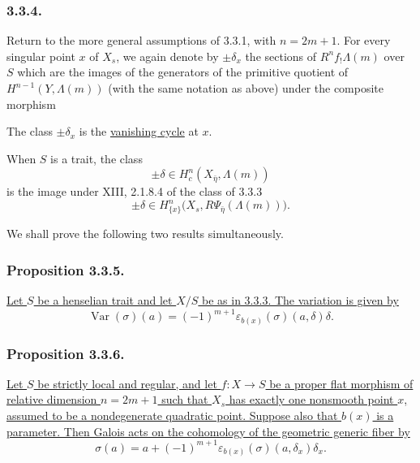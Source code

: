 \subsubsection*{3.3.4.}
Return to the more general assumptions of 3.3.1, with $n=2m+1$.
For every singular point $x$ of $X_s$, we again denote by
$\pm\delta_x$ the sections of $R^nf_!\Lambda(m)$ over $S$ which are
the images of the generators of the primitive quotient of
$H^{n-1}(Y,\Lambda(m))$ (with the same notation as above) under the
composite morphism
\begin{center}
\end{center}
The class $\pm\delta_x$ is the \underline{vanishing cycle} at $x$.

When $S$ is a trait, the class
\[
\pm\delta\in H_c^n(X_{\bar\eta},\Lambda(m))
\]
is the image under XIII, 2.1.8.4 of the class of 3.3.3
\[
\pm\delta\in
H^n_{\{x\}}\bigl(X_s,R\Psi_{\bar\eta}(\Lambda(m))\bigr).
\]

We shall prove the following two results simultaneously.

\subsubsection*{Proposition 3.3.5.}
\underline{Let $S$ be a henselian trait and let $X/S$ be as in
3.3.3.  The variation is given by}
\[
\operatorname{Var}(\sigma)(a)
=(-1)^{m+1}\varepsilon_{b(x)}(\sigma)(a,\delta)\delta.
\]

\subsubsection*{Proposition 3.3.6.}
\underline{Let $S$ be strictly local and regular, and let
$f:X\to S$ be a proper flat morphism of relative dimension
$n=2m+1$ such that $X_s$ has exactly one nonsmooth point $x$, assumed
to be a nondegenerate quadratic point.  Suppose also that $b(x)$ is
a parameter.  Then Galois acts on the cohomology of the geometric
generic fiber by}
\[
\sigma(a)=a+(-1)^{m+1}
\varepsilon_{b(x)}(\sigma)(a,\delta_x)\delta_x.
\]
